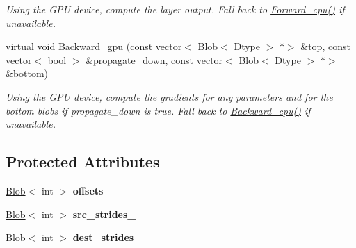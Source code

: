 \begin{DoxyCompactItemize}
\begin{DoxyCompactList}\small\item\em Using the G\+PU device, compute the layer output. Fall back to \mbox{\hyperlink{classcaffe_1_1_crop_layer_ace1eb45b15e9e9f304966ac13152cb59}{Forward\+\_\+cpu()}} if unavailable. \end{DoxyCompactList}\item 
\mbox{\label{classcaffe_1_1_crop_layer_a5797567b3f3c31a4b59b636f80c0040e}} 
virtual void \mbox{\hyperlink{classcaffe_1_1_crop_layer_a5797567b3f3c31a4b59b636f80c0040e}{Backward\+\_\+gpu}} (const vector$<$ \mbox{\hyperlink{classcaffe_1_1_blob}{Blob}}$<$ Dtype $>$ $\ast$$>$ \&top, const vector$<$ bool $>$ \&propagate\+\_\+down, const vector$<$ \mbox{\hyperlink{classcaffe_1_1_blob}{Blob}}$<$ Dtype $>$ $\ast$$>$ \&bottom)
\begin{DoxyCompactList}\small\item\em Using the G\+PU device, compute the gradients for any parameters and for the bottom blobs if propagate\+\_\+down is true. Fall back to \mbox{\hyperlink{classcaffe_1_1_crop_layer_ab73f11ec5c3927435ab9c7e1706919cd}{Backward\+\_\+cpu()}} if unavailable. \end{DoxyCompactList}\end{DoxyCompactItemize}
\subsection*{Protected Attributes}
\begin{DoxyCompactItemize}
\item 
\mbox{\label{classcaffe_1_1_crop_layer_a24e0d1d88a59b47b89e0913b5ee9b335}} 
\mbox{\hyperlink{classcaffe_1_1_blob}{Blob}}$<$ int $>$ {\bfseries offsets}
\item 
\mbox{\label{classcaffe_1_1_crop_layer_a740784d0c4bf284cf3fe4bcd6fbc4fa8}} 
\mbox{\hyperlink{classcaffe_1_1_blob}{Blob}}$<$ int $>$ {\bfseries src\+\_\+strides\+\_\+}
\item 
\mbox{\label{classcaffe_1_1_crop_layer_a0f7cb07527cb66dcd7c3a93b9740b133}} 
\mbox{\hyperlink{classcaffe_1_1_blob}{Blob}}$<$ int $>$ {\bfseries dest\+\_\+strides\+\_\+}
\end{DoxyCompactItemize}



